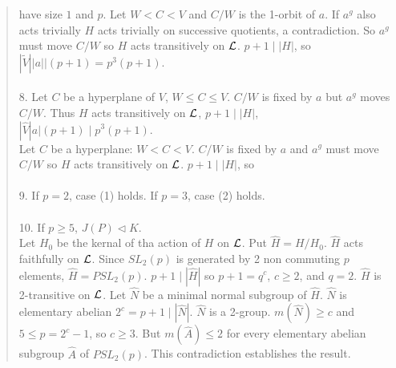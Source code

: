 \begin{quote}
have size $1$ and $p$.  Let $W < C < V$ and $C/W$ is the 1-orbit of $a$.  If $a^g$ also acts trivially $H$ acts
trivially on successive quotients, a contradiction.  So $a^g$ must move $C/W$ 
so $H$ acts transitively on ${\cal L}$.  $p+1 \mid |H|$, so
$|{\tilde V}| |a| |(p+1) = p^3 (p+1)$.
\\
\\
8. Let $C$ be a hyperplane of $V$, $W \leq C \leq V$. $C/W$ is fixed by $a$ but $a^g$ moves $C/W$.  Thus $H$ acts transitively
on ${\cal L}$, $p+1 \mid |H|$, $|{\hat V} |a| (p+1) \mid p^3 (p+1)$.\\
Let $C$ be a hyperplane: $W < C < V$.  $C/W$ is fixed by $a$ and $a^g$
must move $C/W$ so $H$ acts transitively on ${\cal L}$.  $p+1 \mid |H|$, so
\\
\\
9. If $p=2$, case (1) holds.  If $p=3$, case (2) holds.
\\
\\
10. If $p\geq 5$, $J(P) \lhd K$.\\
Let $H_0$ be the kernal of tha action of $H$ on ${\cal L}$. Put ${\hat H} = H/H_0$. ${\hat H}$ acts faithfully on ${\cal L}$.
Since $SL_2(p)$ is generated by 2 non commuting $p$ elements, ${\hat H} = PSL_2(p)$.   $p+1 \mid |{\hat H}|$ so $p+1=q^c$, $c \geq 2$,
and $q=2$.
${\hat H}$ is 2-transitive on ${\cal L}$.  Let ${\hat N}$ be a minimal normal subgroup of ${\hat H}$.  ${\hat N}$ is elementary
abelian $2^c=p+1 \mid |{\hat N}|$. ${\hat N}$ is a 2-group. $m({\hat N}) \geq c$ and
$5 \leq p= 2^c-1$, so $c \geq 3$.  But $m({\hat A}) \leq 2$ for every elementary abelian subgroup ${\hat A}$ of $PSL_2(p)$.  This contradiction
establishes the result.
\end{quote}
